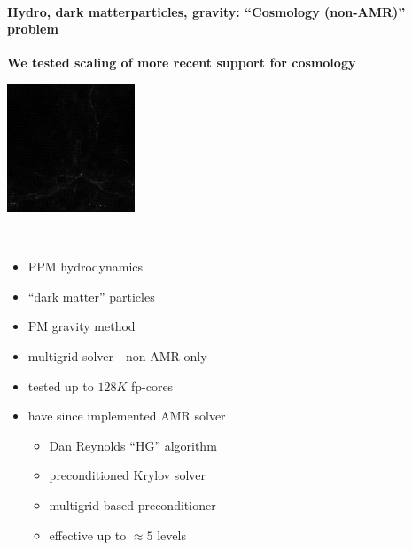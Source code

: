 \begin{frame}[fragile]
 \secframetitle{\ssScaling}
\framesubtitle{Hydro, dark matterparticles, gravity: ``Cosmology (non-AMR)'' problem}

\textbf{We tested scaling of more recent support for cosmology}

\begin{minipage}{1.5in}
  \vspace{0.2in}
  \includegraphics[width=1.5in]{Images/Cosmo/dark-20.png} \\
\end{minipage} \
\begin{minipage}{2.75in}
  \vspace {0.2in}
  \begin{itemize}
  \item PPM hydrodynamics
  \item ``dark matter'' particles
  \item PM gravity method
  \item multigrid solver---non-AMR only
   \item tested up to $128K$ fp-cores
  \item have since implemented AMR solver
    \begin{itemize}
      \item Dan Reynolds ``HG'' algorithm
    \item preconditioned Krylov solver
    \item multigrid-based preconditioner
    \item effective up to $\approx 5$ levels
    \end{itemize}
  \end{itemize}
\end{minipage}
\end{frame}


